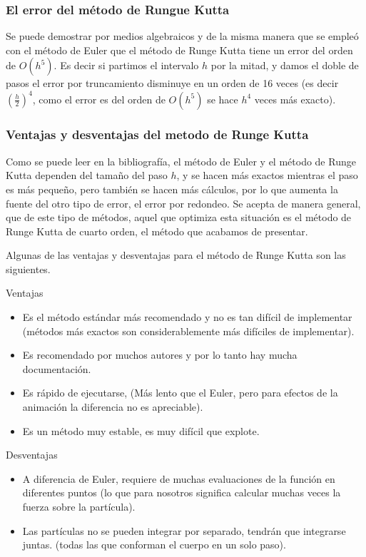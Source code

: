 \subsubsection{El error del método de Rungue Kutta}
Se puede demostrar por medios algebraicos y de la misma manera que se empleó con el método de Euler que el método de Runge Kutta tiene un error del orden de $O(h^5)$. Es decir si partimos el intervalo $h$ por la mitad, y damos el doble de pasos el error por truncamiento disminuye en un orden de 16 veces (es decir $\left( \frac{h}{2} \right)^4$, como el error es del orden de $O(h^5)$ se hace $h^4$ veces más exacto).

\subsubsection{Ventajas y desventajas del metodo de Runge Kutta}
Como se puede leer en la bibliografía, el método de Euler y el método de Runge Kutta dependen del tamaño del paso $h$, y se hacen más exactos mientras el paso es más pequeño, pero también se hacen más cálculos, por lo que aumenta la fuente del otro tipo de error, el error por redondeo. Se acepta de manera general, que de este tipo de métodos, aquel que optimiza esta situación es el método de Runge Kutta de cuarto orden, el método que acabamos de presentar.

Algunas de las ventajas y desventajas para el método de Runge Kutta son las siguientes.

Ventajas
\begin{itemize}
\item Es el método estándar más recomendado y no es tan difícil de implementar (métodos más exactos son considerablemente más difíciles de implementar).
\item Es recomendado por muchos autores y por lo tanto hay mucha documentación.
\item Es rápido de ejecutarse, (Más lento que el Euler, pero para efectos de la animación la diferencia no es apreciable).
\item Es un método muy estable, es muy difícil que explote.
\end{itemize}

Desventajas
\begin{itemize}
\item A diferencia de Euler, requiere de muchas evaluaciones de la función en diferentes puntos (lo que para nosotros significa calcular muchas veces la fuerza sobre la partícula).
\item Las partículas no se pueden integrar por separado, tendrán que integrarse juntas. (todas las que conforman el cuerpo en un solo paso).
\end{itemize}

